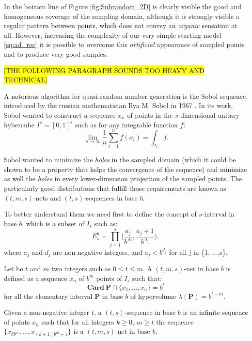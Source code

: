     In the bottom line of Figure \ref{fig:Subrandom_2D} is clearly visible the good and homogeneous coverage of the sampling domain, although it is strongly visible a regular pattern between points, which does not convey an \textit{organic} sensation at all. However, increasing the complexity of our very simple starting model \ref{eq:ad_rec} it is possible to overcome this \textit{artificial} appearance of sampled points and to produce very good samples.

    \hl{[THE FOLLOWING PARAGRAPH SOUNDS TOO HEAVY AND TECHNICAL]}

    A notorious algorithm for quasi-random number generation is the Sobol sequence, introduced by the russian mathematician Ilya M. Sobol in 1967 \cite{SOBOL2001271}. In its work, Sobol wanted to construct a sequence $x_n$ of points in the $s$-dimensional unitary hybercube $I^s = [0,1]^s$ such as for any integrable function $f$:
    \begin{equation}
        \lim_{n\to\infty} \frac{1}{n} \sum_{i=1}^{n} f(x_i) = \int_{I_s} f.
    \end{equation}

    Sobol wanted to minimize the \textit{holes} in the sampled domain (which it could be shown to be a property that helps the convergence of the sequence) and minimize as well the \textit{holes} in every lower-dimension projection of the sampled points. The particularly good distributions that fulfill those requirements are known as $(t,m,s)$-nets and $(t,s)$-sequences in base $b$.

    To better understand them we need first to define the concept of $s$-interval in base $b$, which is a subset of $I_s$ such as:
    \begin{equation}
        E_s^b = \prod_{j=1}^{s} \Bigg[ \frac{a_j}{b^{\,d_j}}, \frac{a_j + 1}{b^{\,d_j}}\Bigg),
    \end{equation}
    where $a_j$ and $d_j$ are non-negative integers, and $a_j < b^{d_j}$ for all j in \{1, ...,s\}.

    Let be $t$ and $m$ two integers such as $0 \leq t \leq m$. A $(t,m,s)$-net in base $b$ is defined as a sequence $x_n$ of $b^m$ points of $I_s$ such that:
    \begin{equation}
        \mathbf{Card} \ \mathbf{P} \cap \{x_1, \dots, x_n \} = b^t
    \end{equation}
    for all the elementary  interval $\mathbf{P}$ in base $b$ of hypervolume $\lambda(\mathbf{P}) =  b^{t-m}$.

    Given a non-negative integer $t$, a $(t,s)$-sequence in base $b$ is an infinite sequence of points $x_n$ such that for all integers $k \geq 0$, $m \geq t$ the sequence $ \{ x_{kb^m}, \dots, x_{(k+1)b^m-1} \}$ is a $(t,m,s)$-net in base $b$.

